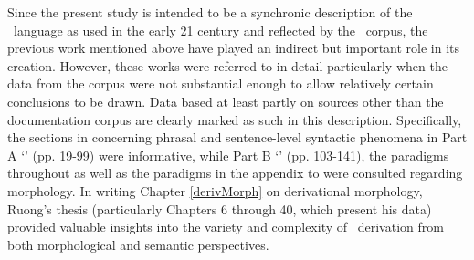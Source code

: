 Since the present study is intended to be a synchronic description of the \PS\ language as used in the early 21 century and reflected by the \PSDP\ corpus, the previous work mentioned above have played an indirect but important role in its creation. However, these works were referred to in detail particularly when the data from the corpus were not substantial enough to allow relatively certain conclusions to be drawn. Data based at least partly on sources other than the documentation corpus are clearly marked as such in this description. Specifically, the sections in \mbox{\citet{Lagercrantz1926}} concerning phrasal and sentence-level syntactic phenomena in Part A ‘’ (pp. 19-99) were informative, while Part B ‘’ (pp. 103-141), the paradigms throughout \citet{Halasz1896} as well as the paradigms in the appendix to \citet[150-166]{Lehtiranta1992} were consulted regarding morphology. In writing Chapter \ref{derivMorph} on derivational morphology, Ruong’s thesis  (particularly Chapters 6 through 40, which present his data) provided valuable insights into the variety and complexity of \PS\ derivation from both morphological and semantic perspectives. %

